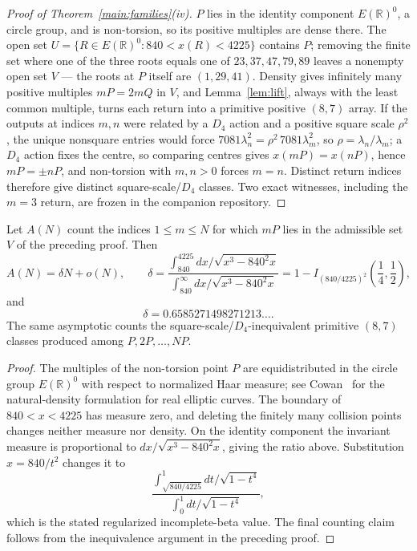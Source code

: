 \begin{proof}[Proof of Theorem~\ref{main:families}(iv)]
$P$ lies in the identity component $E(\mathbb R)^{0}$, a circle group, and
is non-torsion, so its positive multiples are dense there. The open set
$U=\{R\in E(\mathbb R)^{0}:840<x(R)<4225\}$ contains $P$; removing the
finite set where one of the three roots equals one of $23,37,47,79,89$
leaves a nonempty open set $V$ --- the roots at $P$ itself are $(1,29,41)$.
Density gives infinitely many positive multiples $mP=2mQ$ in $V$, and
Lemma~\ref{lem:lift}, always with the least common multiple, turns each
return into a primitive positive $(8,7)$ array. If the outputs at indices
$m,n$ were related by a $D_4$ action and a positive square scale $\rho^2$,
the unique nonsquare entries would force
$7081\lambda_n^2=\rho^2\,7081\lambda_m^2$, so $\rho=\lambda_n/\lambda_m$;
a $D_4$ action fixes the centre, so comparing centres gives
$x(mP)=x(nP)$, hence $mP=\pm nP$, and non-torsion with $m,n>0$ forces
$m=n$. Distinct return indices therefore give distinct
square-scale/$D_4$ classes. Two exact witnesses, including the $m=3$
return, are frozen in the companion repository.
\end{proof}

\begin{corollary}\label{cor:orbitdensity}
Let $A(N)$ count the indices $1\le m\le N$ for which $mP$ lies in the
admissible set $V$ of the preceding proof. Then
\[
A(N)=\delta N+o(N),
\qquad
\delta=
\frac{\displaystyle\int_{840}^{4225}
dx/\sqrt{x^3-840^2x}}
{\displaystyle\int_{840}^{\infty}dx/\sqrt{x^3-840^2x}}
=1-I_{(840/4225)^2}\!\left(\frac14,\frac12\right),
\]
and
\[
\delta=0.6585271498271213\ldots .
\]
The same asymptotic counts the square-scale/$D_4$-inequivalent primitive
$(8,7)$ classes produced among $P,2P,\ldots,NP$.
\end{corollary}

\begin{proof}
The multiples of the non-torsion point $P$ are equidistributed in the
circle group $E(\mathbb R)^0$ with respect to normalized Haar measure; see
Cowan~\cite{COW20} for the natural-density formulation for real elliptic
curves. The boundary of $840<x<4225$ has measure zero, and deleting the
finitely many collision points changes neither measure nor density. On the
identity component the invariant measure is proportional to
$dx/\sqrt{x^3-840^2x}$, giving the ratio above. Substitution
$x=840/t^2$ changes it to
\[
\frac{\displaystyle\int_{\sqrt{840/4225}}^1dt/\sqrt{1-t^4}}
{\displaystyle\int_0^1dt/\sqrt{1-t^4}},
\]
which is the stated regularized incomplete-beta value. The final counting
claim follows from the inequivalence argument in the preceding proof.
\end{proof}

